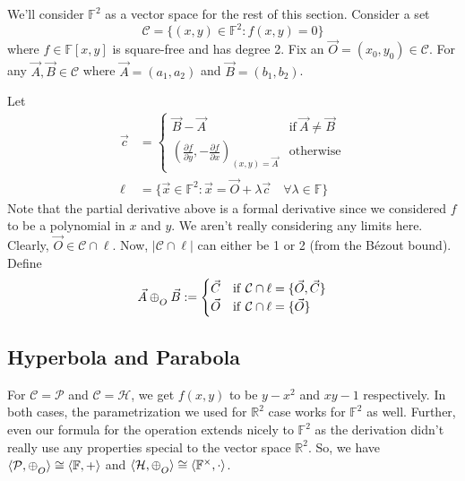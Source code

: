 \noindent
We'll consider $\mathbb{F}^2$ as a vector space for the rest of this section. 
Consider a set
\[ \mathcal{C} = \{(x,y)\in\mathbb{F}^2: f(x,y)=0\} \]
where $f\in\mathbb{F}[x,y]$ is square-free and has degree 2. Fix an
$\vec O=(x_0,y_0)\in\mathcal{C}$.  For any $\vec{A},\vec{B}\in\mathcal{C}$ where
$\vec{A}=(a_1,a_2)$ and $\vec{B}=(b_1,b_2)$.
\vspace{1ex}

\noindent
Let 
\begin{align*}
    \vec{c} &=
        \begin{cases}
            \vec{B}-\vec{A} & \mathrm{if}\ \vec{A}\neq\vec{B} \\
            \left(
                \frac{\partial f}{\partial y}, -\frac{\partial f}{\partial x}
            \right)_{(x,y)=\vec{A}} & \mathrm{otherwise}
        \end{cases} \\
    \ell &=
        \{\vec{x}\in\mathbb{F}^2:
        \vec{x} = \vec{O} + \lambda\vec{c}\quad\forall\lambda\in\mathbb{F}\}
\end{align*}
Note that the partial derivative above is a formal derivative since we considered
$f$ to be a polynomial in $x$ and $y$. We aren't really considering any limits
here. Clearly, $\vec{O}\in\mathcal{C}\cap\ell$. Now, $|\mathcal{C}\cap\ell|$ can
either be 1 or 2 (from the B\'ezout bound). Define
\[
    \vec{A} \conop \vec{B} :=
        \begin{cases}
            \vec{C} & \mathrm{if}\ \mathcal{C}\cap\ell = \{\vec{O},\vec{C}\} \\
            \vec{O} & \mathrm{if}\ \mathcal{C}\cap\ell = \{\vec{O}\} \\
        \end{cases}
\]

\subsection*{Hyperbola and Parabola}

For $\mathcal{C}=\mathcal{P}$ and $\mathcal{C}=\mathcal{H}$, we get $f(x,y)$ to be
$y - x^2$ and $xy - 1$ respectively. In both cases, the parametrization we used
for $\mathbb{R}^2$ case works for $\mathbb{F}^2$ as well. Further, even our
formula for the operation extends nicely to $\mathbb{F}^2$ as the derivation
didn't really use any properties special to the vector space $\mathbb{R}^2$. So,
we have $\langle\mathcal{P},\conop\rangle \cong \langle\mathbb{F},+\rangle$ and
$\langle\mathcal{H},\conop\rangle \cong \langle\mathbb{F}^\times,\cdot\rangle$.


